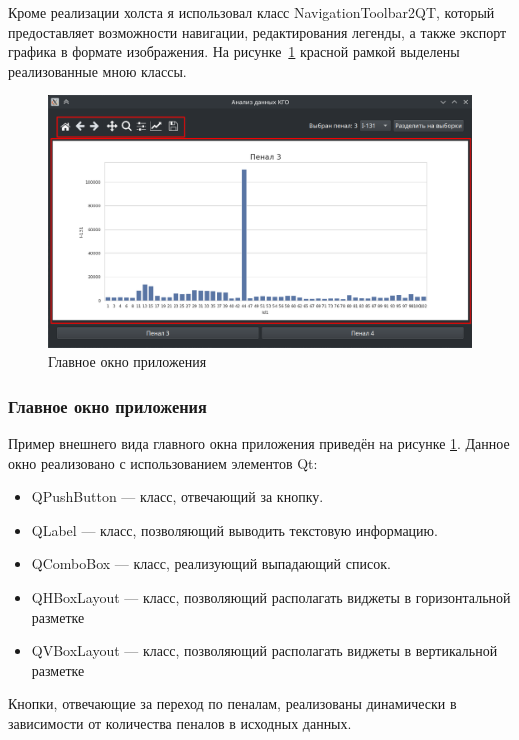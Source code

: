 Кроме реализации холста я использовал класс NavigationToolbar2QT, который предоставляет возможности навигации, редактирования легенды, а также экспорт графика в формате изображения. На рисунке~\ref{fig:ris8} красной рамкой выделены реализованные мною классы.

\begin{figure}[H]
	\centering
	\includegraphics[width=1\linewidth]{pics/ris8} %
	\caption{Главное окно приложения}
	\label{fig:ris8} %
\end{figure}

\subsubsection{Главное окно приложения}

Пример внешнего вида главного окна приложения приведён на рисунке \ref{fig:ris8}. Данное окно реализовано с использованием элементов Qt:

\begin{itemize}
	\item QPushButton --- класс, отвечающий за кнопку.
	\item QLabel --- класс, позволяющий выводить текстовую информацию.
	\item QComboBox --- класс, реализующий выпадающий список.
	\item QHBoxLayout --- класс, позволяющий располагать виджеты в горизонтальной разметке
	\item QVBoxLayout --- класс, позволяющий располагать виджеты в вертикальной разметке
\end{itemize}

Кнопки, отвечающие за переход по пеналам, реализованы динамически в зависимости от количества пеналов в исходных данных.

